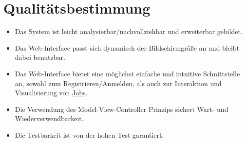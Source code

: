 \section{Qualitätsbestimmung}
\begin{itemize}    
    \item Das System ist leicht analysierbar/nachvollziehbar und erweiterbar gebildet.
    \item Das \gls{Web-Interface} passt sich dynamisch der Bildschirmgröße an und bleibt dabei benutzbar.
    \item Das \gls{Web-Interface} bietet eine möglichst einfache und intuitive Schnittstelle an, sowohl zum Registrieren/Anmelden, als auch zur Interaktion und Visualisierung von \hyperref[B:Jobs]{Jobs}.
    \item Die Verwendung des \gls{Model-View-Controller} Prinzips sichert Wart- und Wiederverwendbarkeit.
    \item Die Testbarkeit ist von der hohen Test garantiert.
\end{itemize}